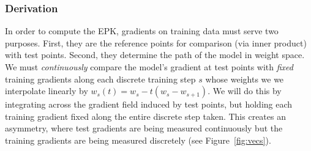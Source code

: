 \begin{frame}
  \frametitle{Derivation}
 In order to compute the EPK, gradients on training data must serve two purposes. 
 First, they are the reference points for comparison (via inner product) with test points. 
 Second, they determine the path of the model in weight space. \\
 We must \textit{continuously} compare the model's gradient at test points with \textit{fixed} training gradients along each discrete training step $s$ whose weights we we interpolate linearly by $w_s(t) = w_s - t(w_s - w_{s+1})$. We will do this by integrating across the gradient field induced by test points, but holding each training gradient fixed along the entire discrete step taken. This creates an asymmetry, where test gradients are being measured continuously but the training gradients are being measured discretely (see Figure~\ref{fig:vecs}).
\end{frame}
